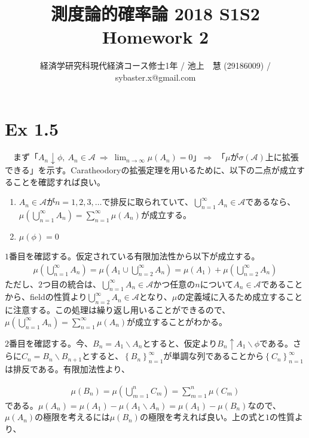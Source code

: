 \documentclass{article}
\begin{document}
\title{測度論的確率論 2018 S1S2 \\ 
Homework 2}
\author{経済学研究科現代経済コース修士1年 / 池上　慧 (29186009) / sybaster.x@gmail.com}
\maketitle

\section{Ex 1.5}
　まず「$A_n \downarrow \phi,\ A_n \in \mathcal{A}\ \Rightarrow\ \lim_{n \to \infty} \mu \left( A_n \right) = 0$」$\Rightarrow$ 「$\mu$が$\sigma\left( \mathcal{A} \right)$上に拡張できる」を示す。Caratheodoryの拡張定理を用いるために、以下の二点が成立することを確認すれば良い。
\begin{enumerate}
	\item $A_n \in \mathcal{A}$が$n = 1,2,3,\dots$で排反に取られていて、$\bigcup_{n = 1}^{\infty} A_n \in \mathcal{A}$であるなら、$\mu \left( \bigcup_{n = 1}^{\infty} A_n \right) = \sum_{n = 1}^{\infty} \mu \left( A_n \right)$が成立する。
	\item $\mu(\phi) = 0$
\end{enumerate}

$1$番目を確認する。仮定されている有限加法性から以下が成立する。
\begin{align*}
	\mu \left(  \bigcup_{n = 1}^{\infty} A_n \right) = \mu \left( A_1 \cup  \bigcup_{n = 2}^{\infty} A_n \right) = \mu \left( A_1 \right) + \mu \left( \bigcup_{n = 2}^{\infty} A_n \right)
\end{align*}
ただし、$2$つ目の統合は、$\bigcup_{n = 1}^{\infty} A_n \in \mathcal{A}$かつ任意の$n$について$A_n \in \mathcal{A}$であることから、fieldの性質より$ \bigcup_{n = 2}^{\infty} A_n \in \mathcal{A}$となり、$\mu$の定義域に入るため成立することに注意する。この処理は繰り返し用いることができるので、$\mu \left( \bigcup_{n = 1}^{\infty} A_n \right) = \sum_{n = 1}^{\infty} \mu \left( A_n \right)$が成立することがわかる。

$2$番目を確認する。今、$B_n = A_1 \backslash A_n$とすると、仮定より$B_n \uparrow A_1 \backslash \phi$である。さらに$C_n = B_n \backslash B_{n+ 1}$とすると、$\left\{ B_n \right\}_{n = 1}^{\infty}$が単調な列であることから$\left\{ C_n \right\}_{n = 1}^{\infty}$は排反である。有限加法性より、

\begin{align*}
	\mu \left( B_n \right) = \mu \left( \bigcup_{m = 1}^n C_m \right) = \sum_{m = 1}^n \mu \left( C_m \right)
\end{align*}
である。$\mu\left( A_n \right) = \mu \left( A_1 \right) - \mu \left( A_1 \backslash A_n \right) = \mu \left( A_1 \right) - \mu \left( B_n \right)$なので、$\mu \left( A_n \right)$の極限を考えるには$\mu \left( B_n \right)$の極限を考えれば良い。上の式と$1$の性質より、
\end{document}
